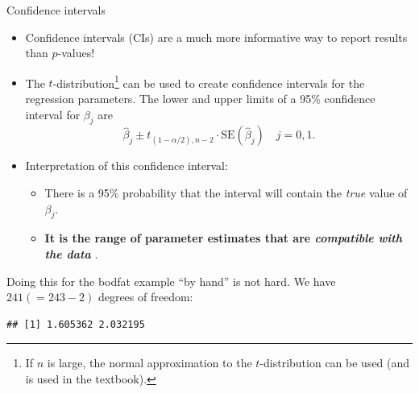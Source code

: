 \documentclass[10pt,ignorenonframetext,]{beamer}
\newenvironment{Shaded}{\begin{snugshade}}{\end{snugshade}}
\newcommand{\KeywordTok}[1]{\textcolor[rgb]{0.13,0.29,0.53}{\textbf{#1}}}
\newcommand{\DecValTok}[1]{\textcolor[rgb]{0.00,0.00,0.81}{#1}}
\newcommand{\FloatTok}[1]{\textcolor[rgb]{0.00,0.00,0.81}{#1}}
\newcommand{\StringTok}[1]{\textcolor[rgb]{0.31,0.60,0.02}{#1}}
\newcommand{\OperatorTok}[1]{\textcolor[rgb]{0.81,0.36,0.00}{\textbf{#1}}}
\newcommand{\NormalTok}[1]{#1}
\begin{document}
\begin{frame}

\begin{block}{Confidence intervals}

\vspace{2mm}

\begin{itemize}
\item
  Confidence intervals (CIs) are a much more informative way to report
  results than \(p\)-values!
\item
  The
  \(t\)-distribution\footnote{If $n$ is large, the normal approximation to the $t$-distribution can be used (and is used in the textbook).}
  can be used to create confidence intervals for the regression
  parameters. The lower and upper limits of a 95\% confidence interval
  for \(\beta_j\) are
  \[\hat{\beta}_j \pm t_{(1-\alpha/2),n-2} \cdot\text{SE} (\hat{\beta}_j) \quad j=0, 1.\]
\item
  Interpretation of this confidence interval:

  \begin{itemize}
  \item
    There is a 95\% probability that the interval will contain the
    \emph{true} value of \(\beta_j\).
  \item
    \textbf{It is the range of parameter estimates that are
    \emph{compatible with the data} }.
  \end{itemize}
\end{itemize}

\end{block}

\end{frame}

\begin{frame}[fragile]

Doing this for the bodfat example ``by hand'' is not hard. We have
\(241 (=243-2)\) degrees of freedom:

\scriptsize

\begin{Shaded}
\end{Shaded}

\begin{verbatim}
## [1] 1.605362 2.032195
\end{verbatim}

\end{frame}
\end{document}
